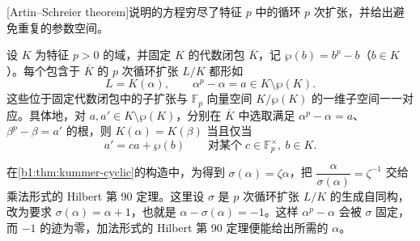 [Artin--Schreier theorem]说明的方程穷尽了特征 \(p\) 中的循环 \(p\) 次扩张，并给出避免重复的参数空间。

\begin{theorem}\label{b1:thm:artin-schreier-classification}
	设 \(K\) 为特征 \(p>0\) 的域，并固定 \(K\) 的代数闭包 \(\overline K\)，记 \(\wp(b)=b^p-b\)（\(b\in K\)）。每个包含于 \(\overline K\) 的 \(p\) 次循环扩张 \(L/K\) 都形如
	\[
		L=K(\alpha),\qquad\alpha^p-\alpha=a\in K\setminus\wp(K).
	\]
	这些位于固定代数闭包中的子扩张与 \(\mathbb F_p\) 向量空间 \(K/\wp(K)\) 的一维子空间一一对应。具体地，对 \(a,a'\in K\setminus\wp(K)\)，分别在 \(\overline K\) 中选取满足 \(\alpha^p-\alpha=a\)、\(\beta^p-\beta=a'\) 的根，则 \(K(\alpha)=K(\beta)\) 当且仅当
	\[
		a'=ca+\wp(b)\qquad\text{对某个}\;c\in\mathbb F_p^\times,\ b\in K.
	\]
\end{theorem}

在\cref{b1:thm:kummer-cyclic}的构造中，为得到 \(\sigma(\alpha)=\zeta\alpha\)，把 \(\dfrac{\alpha}{\sigma(\alpha)}=\zeta^{-1}\) 交给乘法形式的 Hilbert 第 90 定理。这里设 \(\sigma\) 是 \(p\) 次循环扩张 \(L/K\) 的生成自同构，改为要求 \(\sigma(\alpha)=\alpha+1\)，也就是 \(\alpha-\sigma(\alpha)=-1\)。这样 \(\alpha^p-\alpha\) 会被 \(\sigma\) 固定，而 \(-1\) 的迹为零，加法形式的 Hilbert 第 90 定理便能给出所需的 \(\alpha\)。


